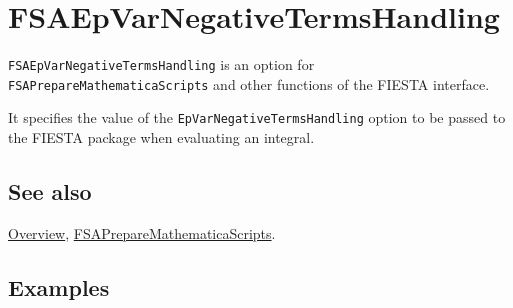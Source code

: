\documentclass[../FeynHelpersManual.tex]{subfiles}
\begin{document}
\hypertarget{fsaepvarnegativetermshandling}{
\section{FSAEpVarNegativeTermsHandling}\label{fsaepvarnegativetermshandling}}

\texttt{FSAEpVarNegativeTermsHandling} is an option for
\texttt{FSAPrepareMathematicaScripts} and other functions of the FIESTA
interface.

It specifies the value of the \texttt{EpVarNegativeTermsHandling} option
to be passed to the FIESTA package when evaluating an integral.

\subsection{See also}

\hyperlink{toc}{Overview},
\hyperlink{fsapreparemathematicascripts}{FSAPrepareMathematicaScripts}.

\subsection{Examples}
\end{document}
